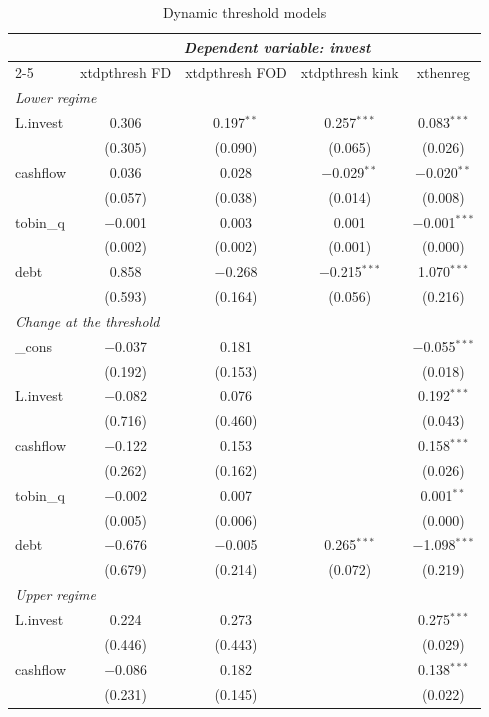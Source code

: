 \begin{table}[!htbp]
\centering
\caption{Dynamic threshold models}
\label{tab:dpt}
\begin{tabular}{lcccc}
\toprule
 & \multicolumn{4}{c}{\textit{Dependent variable: invest}} \\
\cmidrule(lr){2-5}
 & xtdpthresh FD & xtdpthresh FOD & xtdpthresh kink & xthenreg \\
\midrule
\multicolumn{5}{l}{\textit{Lower regime}} \\
L.invest & 0.306 & 0.197$^{**}$ & 0.257$^{***}$ & 0.083$^{***}$ \\
 & (0.305) & (0.090) & (0.065) & (0.026) \\
cashflow & 0.036 & 0.028 & $-$0.029$^{**}$ & $-$0.020$^{**}$ \\
 & (0.057) & (0.038) & (0.014) & (0.008) \\
tobin\_q & $-$0.001 & 0.003 & 0.001 & $-$0.001$^{***}$ \\
 & (0.002) & (0.002) & (0.001) & (0.000) \\
debt & 0.858 & $-$0.268 & $-$0.215$^{***}$ & 1.070$^{***}$ \\
 & (0.593) & (0.164) & (0.056) & (0.216) \\
\multicolumn{5}{l}{\textit{Change at the threshold}} \\
\_cons & $-$0.037 & 0.181 &  & $-$0.055$^{***}$ \\
 & (0.192) & (0.153) &  & (0.018) \\
L.invest & $-$0.082 & 0.076 &  & 0.192$^{***}$ \\
 & (0.716) & (0.460) &  & (0.043) \\
cashflow & $-$0.122 & 0.153 &  & 0.158$^{***}$ \\
 & (0.262) & (0.162) &  & (0.026) \\
tobin\_q & $-$0.002 & 0.007 &  & 0.001$^{**}$ \\
 & (0.005) & (0.006) &  & (0.000) \\
debt & $-$0.676 & $-$0.005 & 0.265$^{***}$ & $-$1.098$^{***}$ \\
 & (0.679) & (0.214) & (0.072) & (0.219) \\
\multicolumn{5}{l}{\textit{Upper regime}} \\
L.invest & 0.224 & 0.273 &  & 0.275$^{***}$ \\
 & (0.446) & (0.443) &  & (0.029) \\
cashflow & $-$0.086 & 0.182 &  & 0.138$^{***}$ \\
 & (0.231) & (0.145) &  & (0.022) \\

\end{tabular}
\end{table}
